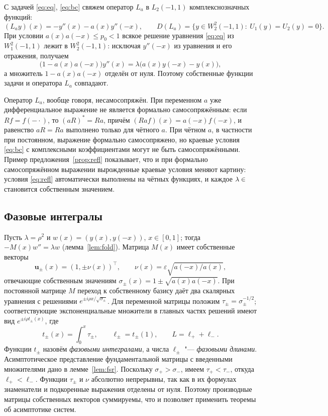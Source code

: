 \documentclass[12pt,a4paper]{article}
\numberwithin{equation}{section}
\theoremstyle{definition}
\let\C\relax\newcommand{\C}{\mathbb C}
\begin{document}
С задачей \eqref{eq:eq}, \eqref{eq:bc} свяжем оператор $L_a$ в $L_2(-1,1)$ комплекснозначных функций:
\[
 (L_ay)(x)=-y''(x)-a(x)y''(-x),\qquad
 D(L_a)=\{y\in W_2^2(-1,1):\ U_1(y)=U_2(y)=0\}.
\]
При условии $a(x)a(-x)\le p_0<1$ всякое решение уравнения \eqref{eq:eq} из $W^2_1(-1,1)$
лежит в $W_2^2(-1,1)$: исключая $y''(-x)$ из уравнения и его отражения, получаем
\[
 \bigl(1-a(x)a(-x)\bigr)y''(x)=\lambda\bigl(a(x)y(-x)-y(x)\bigr),
\]
а множитель $1-a(x)a(-x)$ отделён от нуля. Поэтому собственные функции задачи и оператора
$L_a$ совпадают.

Оператор $L_a$, вообще говоря, несамосопряжён. При переменном $a$ уже дифференциальное
выражение не является формально самосопряжённым: если $Rf=f(-\cdot)$, то $(aR)^*=Ra$,
причём $(Raf)(x)=a(-x)f(-x)$, и равенство $aR=Ra$ выполнено только для чётного $a$.
При чётном $a$, в частности при постоянном, выражение формально самосопряжено, но краевые
условия \eqref{eq:bc} с комплексными коэффициентами могут не быть самосопряжёнными. Пример
предложения~\ref{prop:refl} показывает, что и при формально самосопряжённом выражении
вырожденные краевые условия меняют картину: условия \eqref{eq:refl} автоматически выполнены
на чётных функциях, и каждое $\lambda\in\C$ становится собственным значением.

\subsection{Фазовые интегралы}\label{ss:chan}

Пусть $\lambda=\rho^2$ и $w(x)=(y(x),y(-x))$, $x\in[0,1]$; тогда $-M(x)w''=\lambda w$
(лемма~\ref{lem:fold}). Матрица $M(x)$ имеет собственные векторы
\[
 \mathbf u_\pm(x)=(1,\pm\nu(x))^\top,\qquad \nu(x)=\varepsilon\sqrt{a(-x)/a(x)},
\]
отвечающие собственным значениям $\sigma_\pm(x)=1\pm\sqrt{a(x)a(-x)}$. При постоянной матрице 
$M$ переход к собственному базису даёт два скалярных уравнения с решениями $e^{\pm i\rho x/\sqrt{\sigma_\pm}}$.
Для переменной матрицы положим $\tau_\pm=\sigma_\pm^{-1/2}$; соответствующие
экспоненциальные множители в главных частях решений имеют вид $e^{\pm i\rho t_\pm(x)}$, где
\begin{equation}\label{eq:not}
 t_\pm(x)=\int_0^x\tau_\pm,\qquad \ell_\pm=t_\pm(1),\qquad L=\ell_++\ell_-.
\end{equation}
Функции $t_\pm$ назовём \emph{фазовыми интегралами}, а числа $\ell_\pm$ "--- \emph{фазовыми
длинами}. Асимптотическое представление фундаментальной матрицы с введенными множителями дано в
лемме~\ref{lem:fsr}. Поскольку $\sigma_+>\sigma_-$, имеем $\tau_+<\tau_-$, откуда $\ell_+<\ell_-$.
Функции $\tau_\pm$ и $\nu$ абсолютно непрерывны, так как в их формулах знаменатели и
подкоренные выражения отделены от нуля. Поэтому производные матрицы собственных
векторов суммируемы, что и позволяет применить теоремы об асимптотике систем.
\end{document}
